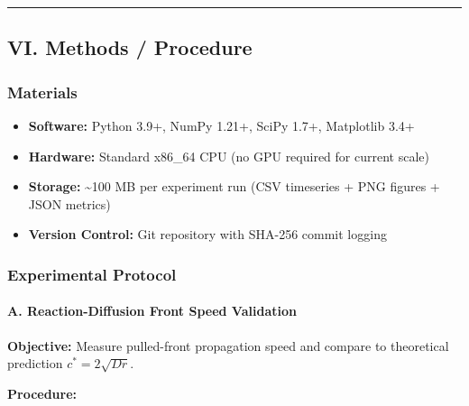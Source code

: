 \documentclass[
]{article}
\providecommand{\tightlist}{%
  \setlength{\itemsep}{0pt}\setlength{\parskip}{0pt}}
\begin{document}
\begin{center}\rule{0.5\linewidth}{0.5pt}\end{center}

\hypertarget{vi.-methods-procedure}{%
\subsection{VI. Methods / Procedure}\label{vi.-methods-procedure}}

\hypertarget{materials}{%
\subsubsection{Materials}\label{materials}}

\begin{itemize}
\tightlist
\item
  \textbf{Software:} Python 3.9+, NumPy 1.21+, SciPy 1.7+, Matplotlib
  3.4+
\item
  \textbf{Hardware:} Standard x86\_64 CPU (no GPU required for current
  scale)
\item
  \textbf{Storage:} \textasciitilde100 MB per experiment run (CSV
  timeseries + PNG figures + JSON metrics)
\item
  \textbf{Version Control:} Git repository with SHA-256 commit logging
\end{itemize}

\hypertarget{experimental-protocol}{%
\subsubsection{Experimental Protocol}\label{experimental-protocol}}

\hypertarget{a.-reaction-diffusion-front-speed-validation}{%
\paragraph{A. Reaction-Diffusion Front Speed
Validation}\label{a.-reaction-diffusion-front-speed-validation}}

\textbf{Objective:} Measure pulled-front propagation speed and compare
to theoretical prediction \(c^{\ast} = 2\sqrt{Dr}\).

\textbf{Procedure:}
\end{document}
